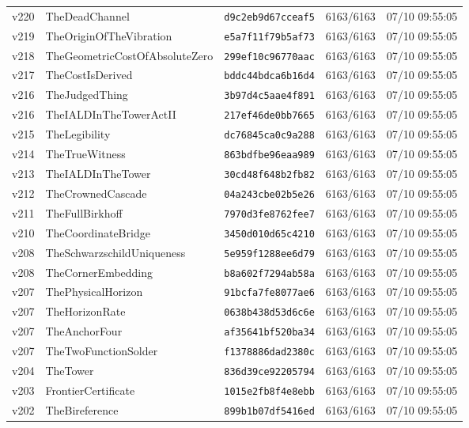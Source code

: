 \documentclass[11pt]{article}
\theoremstyle{definition}\newtheorem{deriv}{Derivação}
\begin{document}
{\begin{longtable}{@{}lllll@{}}
v220 & TheDeadChannel & \texttt{d9c2eb9d67cceaf5} & 6163/6163 & 07/10 09:55:05 \\
v219 & TheOriginOfTheVibration & \texttt{e5a7f11f79b5af73} & 6163/6163 & 07/10 09:55:05 \\
v218 & TheGeometricCostOfAbsoluteZero & \texttt{299ef10c96770aac} & 6163/6163 & 07/10 09:55:05 \\
v217 & TheCostIsDerived & \texttt{bddc44bdca6b16d4} & 6163/6163 & 07/10 09:55:05 \\
v216 & TheJudgedThing & \texttt{3b97d4c5aae4f891} & 6163/6163 & 07/10 09:55:05 \\
v216 & TheIALDInTheTowerActII & \texttt{217ef46de0bb7665} & 6163/6163 & 07/10 09:55:05 \\
v215 & TheLegibility & \texttt{dc76845ca0c9a288} & 6163/6163 & 07/10 09:55:05 \\
v214 & TheTrueWitness & \texttt{863bdfbe96eaa989} & 6163/6163 & 07/10 09:55:05 \\
v213 & TheIALDInTheTower & \texttt{30cd48f648b2fb82} & 6163/6163 & 07/10 09:55:05 \\
v212 & TheCrownedCascade & \texttt{04a243cbe02b5e26} & 6163/6163 & 07/10 09:55:05 \\
v211 & TheFullBirkhoff & \texttt{7970d3fe8762fee7} & 6163/6163 & 07/10 09:55:05 \\
v210 & TheCoordinateBridge & \texttt{3450d010d65c4210} & 6163/6163 & 07/10 09:55:05 \\
v208 & TheSchwarzschildUniqueness & \texttt{5e959f1288ee6d79} & 6163/6163 & 07/10 09:55:05 \\
v208 & TheCornerEmbedding & \texttt{b8a602f7294ab58a} & 6163/6163 & 07/10 09:55:05 \\
v207 & ThePhysicalHorizon & \texttt{91bcfa7fe8077ae6} & 6163/6163 & 07/10 09:55:05 \\
v207 & TheHorizonRate & \texttt{0638b438d53d6c6e} & 6163/6163 & 07/10 09:55:05 \\
v207 & TheAnchorFour & \texttt{af35641bf520ba34} & 6163/6163 & 07/10 09:55:05 \\
v207 & TheTwoFunctionSolder & \texttt{f1378886dad2380c} & 6163/6163 & 07/10 09:55:05 \\
v204 & TheTower & \texttt{836d39ce92205794} & 6163/6163 & 07/10 09:55:05 \\
v203 & FrontierCertificate & \texttt{1015e2fb8f4e8ebb} & 6163/6163 & 07/10 09:55:05 \\
v202 & TheBireference & \texttt{899b1b07df5416ed} & 6163/6163 & 07/10 09:55:05 \\

\end{longtable}}
\end{document}

